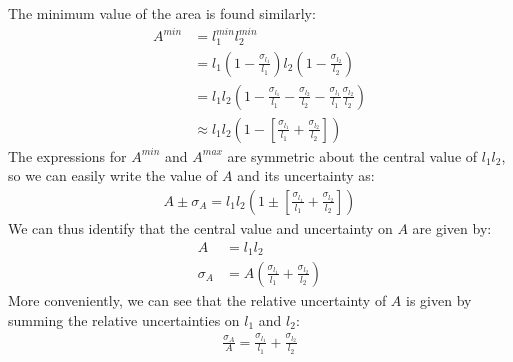 The minimum value of the area is found similarly:
\begin{align}
A^{min}&=l_1^{min}l_2^{min}\nonumber\\
  &=l_1\left(1-\frac{\sigma_{l_1}}{l_1}\right)l_2\left(1-\frac{\sigma_{l_2}}{l_2}\right)\nonumber\\
  &=l_1l_2\left(1-\frac{\sigma_{l_1}}{l_1}-\frac{\sigma_{l_2}}{l_2}-\frac{\sigma_{l_1}}{l_1}\frac{\sigma_{l_2}}{l_2}\right)\nonumber\\
  &\approx l_1l_2\left(1-\left[\frac{\sigma_{l_1}}{l_1}+\frac{\sigma_{l_2}}{l_2}\right]\right)
\end{align}
The expressions for $A^{min}$ and $A^{max}$ are symmetric about the central value of $l_1l_2$, so we can easily write the value of $A$ and its uncertainty as:
\begin{align}
A \pm \sigma_{A} = l_1l_2\left(1\pm\left[\frac{\sigma_{l_1}}{l_1}+\frac{\sigma_{l_2}}{l_2}\right]\right)
\end{align}
We can thus identify that the central value and uncertainty on $A$ are given by:
\begin{align}
A&=l_1l_2\nonumber\\
\sigma_{A} &= A\left(\frac{\sigma_{l_1}}{l_1}+\frac{\sigma_{l_2}}{l_2}\right)
\end{align}
More conveniently, we can see that the relative uncertainty of $A$ is given by summing the relative uncertainties on $l_1$ and $l_2$:
\begin{align}
\frac{\sigma_{A}}{A}=\frac{\sigma_{l_1}}{l_1}+\frac{\sigma_{l_2}}{l_2}
\end{align}


